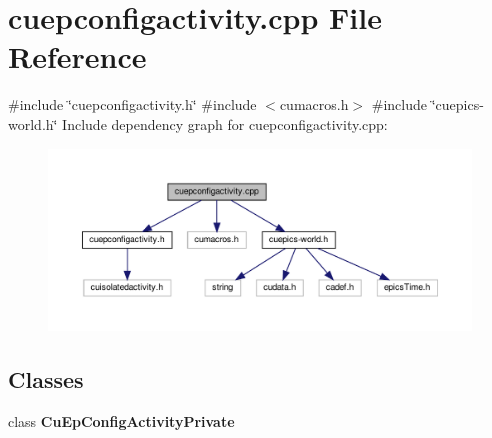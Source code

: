 \section{cuepconfigactivity.\+cpp File Reference}
\label{cuepconfigactivity_8cpp}
{\ttfamily \#include \char`\"{}cuepconfigactivity.\+h\char`\"{}}\newline
{\ttfamily \#include $<$cumacros.\+h$>$}\newline
{\ttfamily \#include \char`\"{}cuepics-\/world.\+h\char`\"{}}\newline
Include dependency graph for cuepconfigactivity.\+cpp\+:\nopagebreak
\begin{figure}[H]
\begin{center}
\leavevmode
\includegraphics[width=350pt]{cuepconfigactivity_8cpp__incl}
\end{center}
\end{figure}
\subsection*{Classes}
\begin{DoxyCompactItemize}
\item 
class \textbf{ Cu\+Ep\+Config\+Activity\+Private}
\end{DoxyCompactItemize}
